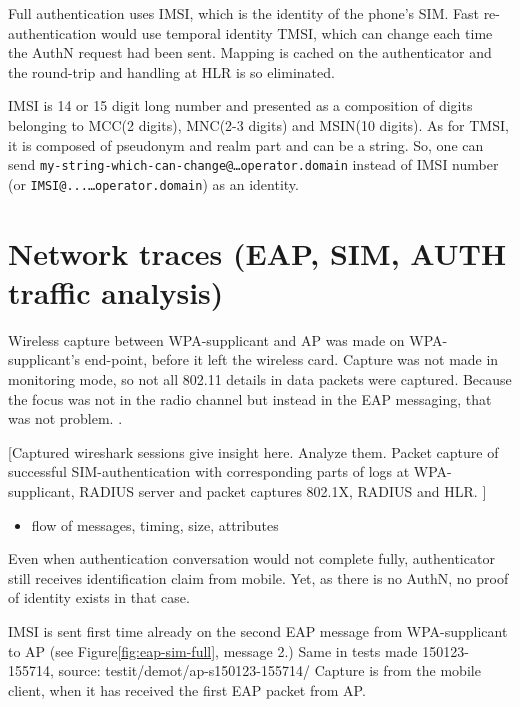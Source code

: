 \documentclass[12pt,a4paper,english]{tutthesis}
\begin{document}
Full authentication uses IMSI, which is the identity of the phone's SIM.
Fast re-authentication would use temporal identity TMSI, which 
can change each time the AuthN request had been sent. Mapping
is cached on the  authenticator and the round-trip and handling at HLR is
so eliminated. 

IMSI is 14 or 15 digit long number and presented as a composition
of digits belonging to MCC(2 digits), MNC(2-3 digits) and MSIN(10 digits).
As for TMSI, it is composed of pseudonym and realm part and can be a
string. So, one can send 
\texttt{my-string-which-can-change@…operator.domain} instead of 
IMSI number (or \texttt{IMSI@...…operator.domain}) as an identity. 


\section{Network traces (EAP, SIM, AUTH traffic analysis)}
\label{sec-5-4}
Wireless capture between WPA-supplicant and AP was made on
WPA-supplicant's end-point, before it left the wireless card. Capture was
not made in monitoring mode, so not all 802.11 details in
data packets were captured.
  Because the focus was not in the
radio channel but instead in the EAP messaging, that was not problem.
 \cite{wireshark-capture}.

[Captured wireshark sessions give insight here. Analyze them.
Packet capture of successful SIM-authentication with corresponding
parts of logs at WPA-supplicant, RADIUS server and packet captures 
802.1X, RADIUS and HLR. ]

\begin{itemize}
\item flow of messages,  timing,  size, attributes
\end{itemize}

Even when authentication conversation would not complete fully,
authenticator still receives identification claim from mobile. Yet, as
there is no AuthN, no proof of identity exists in that case.

IMSI is sent first time already on the second EAP message from 
WPA-supplicant to AP (see Figure\ref{fig:eap-sim-full}, message 2.)
Same in tests made 150123-155714, source:
testit/demot/ap-s150123-155714/
Capture is from the mobile client, when it has received the first EAP
packet from AP.
\end{document}
